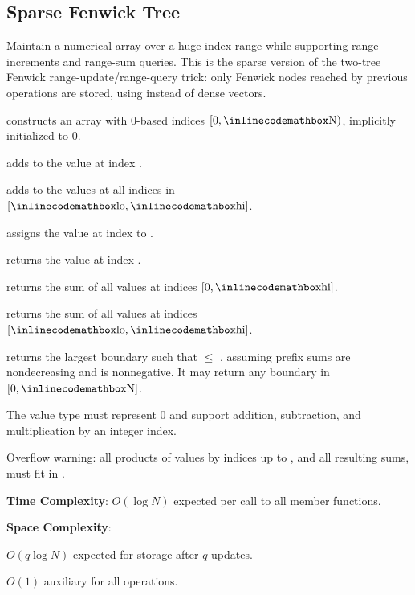 \subsection{Sparse Fenwick Tree}
\label{sec:2.7.4}
Maintain a numerical array over a huge index range while supporting range increments and range-sum queries. This is the sparse version of the two-tree Fenwick range-update/range-query trick: only Fenwick nodes reached by previous operations are stored, using  instead of dense vectors.

\begin{compactitem}
  \item {} constructs an array with 0-based indices $[0, {\inlinecodemath{N}})$, implicitly initialized to $0$.
  \item {} adds  to the value at index .
  \item {} adds  to the values at all indices in $[{\inlinecodemath{lo}}, {\inlinecodemath{hi}}]$.
  \item {} assigns the value at index  to .
  \item {} returns the value at index .
  \item {} returns the sum of all values at indices $[0, {\inlinecodemath{hi}}]$.
  \item {} returns the sum of all values at indices $[{\inlinecodemath{lo}}, {\inlinecodemath{hi}}]$.
  \item {} returns the largest boundary  such that  $\leq$ , assuming prefix sums are nondecreasing and  is nonnegative. It may return any boundary in $[0, {\inlinecodemath{N}}]$.
\end{compactitem}

The value type  must represent $0$ and support addition, subtraction, and multiplication by an integer index.

Overflow warning: all products of values by indices up to , and all resulting sums, must fit in .

\textbf{Time Complexity}: $O(\log N)$ expected per call to all member functions.

\textbf{Space Complexity}:
\begin{compactitem}
  \item $O(q \log N)$ expected for storage after $q$ updates.
  \item $O(1)$ auxiliary for all operations.
\end{compactitem}

